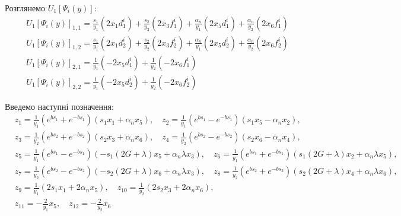 Розглянемо $U_1\left[ \Psi_i(y) \right]$:
\begin{align*}
    &U_1\left[ \Psi_i(y) \right]_{1,1} = \frac{s_1}{y_1} \left( 2 x_1 d_1^i \right) + \frac{s_2}{y_2} \left( 2 x_3 f_1^i \right) 
    + \frac{\alpha_n}{y_1} \left(2 x_5 d_1^i \right) + \frac{\alpha_n}{y_2} \left(2 x_6 f_1^i \right) \\
    &U_1\left[ \Psi_i(y) \right]_{1,2} = \frac{s_1}{y_1} \left( 2 x_1 d_2^i \right) + \frac{s_2}{y_2} \left( 2 x_3 f_2^i \right) 
    + \frac{\alpha_n}{y_1} \left(2 x_5 d_2^i \right) + \frac{\alpha_n}{y_2} \left(2 x_6 f_2^i \right) \\
    &U_1\left[ \Psi_i(y) \right]_{2,1} = \frac{1}{y_1} \left( -2 x_5 d_1^i \right) + \frac{1}{y_2} \left( -2 x_6 f_1^i \right) \\
    &U_1\left[ \Psi_i(y) \right]_{2,2} = \frac{1}{y_1} \left( -2 x_5 d_2^i \right) + \frac{1}{y_2} \left( -2 x_6 f_2^i \right)
\end{align*}

Введемо наступні позначення:
\begin{align*}
    &z_1 = \frac{1}{y_1}\left( e^{b s_1} + e^{-b s_1} \right) \left( s_1 x_1 + \alpha_n x_5 \right), \quad
    z_2 = \frac{1}{y_1}\left( e^{b s_1} - e^{-b s_1} \right) \left( s_1 x_5 - \alpha_n x_2 \right), \\
    &z_3 = \frac{1}{y_2}\left( e^{b s_2} + e^{-b s_2} \right) \left( s_2 x_3 + \alpha_n x_6 \right), \quad
    z_4 = \frac{1}{y_2}\left( e^{b s_2} - e^{-b s_2} \right) \left( s_2 x_6 - \alpha_n x_4 \right), \\
    &z_5 = \frac{1}{y_1}\left( e^{b s_1} - e^{-b s_1} \right) \left( -s_1 (2G + \lambda) x_5 + \alpha_n \lambda x_3 \right), \quad
    z_6 = \frac{1}{y_1}\left( e^{b s_1} + e^{-b s_1} \right) \left( s_1 (2G + \lambda) x_2 + \alpha_n \lambda x_5 \right), \\
    &z_7 = \frac{1}{y_2}\left( e^{b s_2} - e^{-b s_2} \right) \left( -s_2 (2G + \lambda) x_6 + \alpha_n \lambda x_3 \right), \quad
    z_8 = \frac{1}{y_2}\left( e^{b s_2} + e^{-b s_2} \right) \left( s_2 (2G + \lambda) x_4 + \alpha_n \lambda x_6 \right), \\
    &z_9 = \frac{1}{y_1} \left( 2 s_1 x_1 + 2 \alpha_n x_5 \right), \quad
    z_{10} = \frac{1}{y_2} \left( 2 s_2 x_3 + 2 \alpha_n x_6 \right), \\
    &z_{11} = -\frac{2}{y_1} x_5, \quad z_{12} = -\frac{2}{y_2} x_6
\end{align*}

